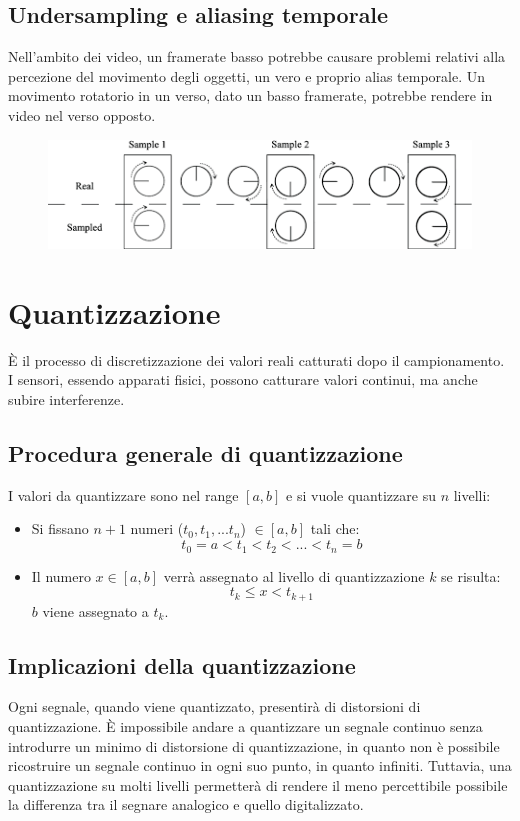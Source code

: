 \documentclass{report}
\begin{document}
	\subsection{Undersampling e aliasing temporale}
	Nell'ambito dei video, un framerate basso potrebbe causare problemi relativi alla percezione del movimento degli oggetti, un vero e proprio alias temporale. Un movimento rotatorio in un verso, dato un basso framerate, potrebbe rendere in video nel verso opposto.
	\begin{figure}[htp]
		\centering
		\includegraphics[width=1\linewidth]{wheel.png}
	\end{figure}
	\section{Quantizzazione}
	È il processo di discretizzazione dei valori reali catturati dopo il campionamento. \\
	I sensori, essendo apparati fisici, possono catturare valori continui, ma anche subire interferenze.
		
	\subsection{Procedura generale di quantizzazione}
	I valori da quantizzare sono nel range $[a,b]$ e si vuole quantizzare su $n$ livelli:
	\begin{itemize}
		\item Si fissano $n+1$ numeri ($t_0,t_1,...t_n$) $\in [a,b]$ tali che:
		      $$
		      t_0 = a < t_1 < t_2 < ... < t_n = b
		      $$
		\item Il numero $x \in [a,b]$ verrà assegnato al livello di quantizzazione $k$ se risulta:
		      $$
		      t_k \leq x < t_{k+1}
		      $$
		      $b$ viene assegnato a $t_k$.
	\end{itemize}
	\subsection{Implicazioni della quantizzazione}
		
	Ogni segnale, quando viene quantizzato, presentirà di distorsioni di quantizzazione. È impossibile andare a quantizzare un segnale continuo senza introdurre un minimo di distorsione di quantizzazione, in quanto non è possibile ricostruire un segnale continuo in ogni suo punto, in quanto infiniti. Tuttavia, una quantizzazione su molti livelli permetterà di rendere il meno percettibile possibile la differenza tra il segnare analogico e quello digitalizzato.
		
\end{document}

